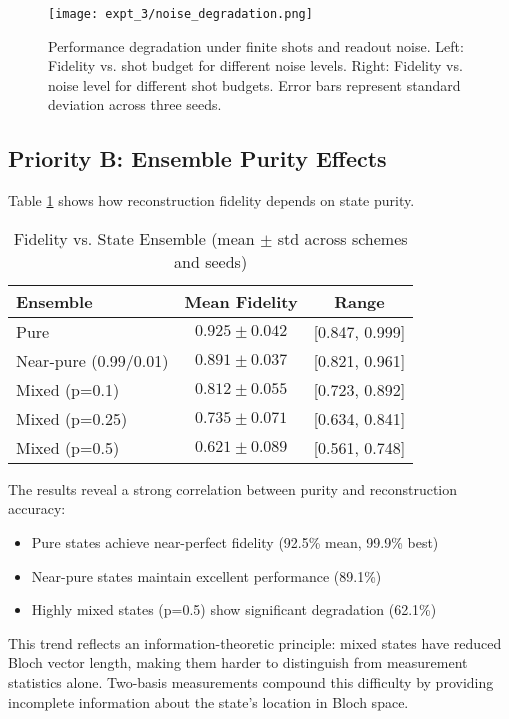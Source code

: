 \documentclass[conference]{IEEEtran}
\begin{document}
\begin{figure}[t]
\centering
\texttt{[image: expt\_3/noise\_degradation.png]}
\caption{Performance degradation under finite shots and readout noise. Left: Fidelity vs. shot budget for different noise levels. Right: Fidelity vs. noise level for different shot budgets. Error bars represent standard deviation across three seeds.}
\label{fig:noise_degradation}
\end{figure}

\subsection{Priority B: Ensemble Purity Effects}

Table \ref{tab:ensemble_performance} shows how reconstruction fidelity depends on state purity.

\begin{table}[t]
\centering
\caption{Fidelity vs. State Ensemble (mean $\pm$ std across schemes and seeds)}
\label{tab:ensemble_performance}
\begin{tabular}{lcc}
\toprule
\textbf{Ensemble} & \textbf{Mean Fidelity} & \textbf{Range} \\
\midrule
Pure & $0.925 \pm 0.042$ & [0.847, 0.999] \\
Near-pure (0.99/0.01) & $0.891 \pm 0.037$ & [0.821, 0.961] \\
Mixed (p=0.1) & $0.812 \pm 0.055$ & [0.723, 0.892] \\
Mixed (p=0.25) & $0.735 \pm 0.071$ & [0.634, 0.841] \\
Mixed (p=0.5) & $0.621 \pm 0.089$ & [0.561, 0.748] \\
\bottomrule
\end{tabular}
\end{table}

The results reveal a strong correlation between purity and reconstruction accuracy:
\begin{itemize}
    \item Pure states achieve near-perfect fidelity (92.5\% mean, 99.9\% best)
    \item Near-pure states maintain excellent performance (89.1\%)
    \item Highly mixed states (p=0.5) show significant degradation (62.1\%)
\end{itemize}

This trend reflects an information-theoretic principle: mixed states have reduced Bloch vector length, making them harder to distinguish from measurement statistics alone. Two-basis measurements compound this difficulty by providing incomplete information about the state's location in Bloch space.
\end{document}
